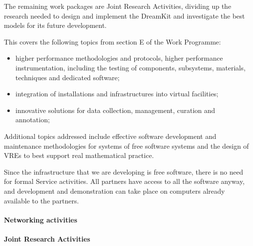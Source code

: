 
The remaining work packages are Joint Research Activities, dividing up
the research needed to design and implement the DreamKit and
investigate the best models for its future development. 

This covers the following topics from section E of the Work Programme:

\begin{itemize}
\item higher performance methodologies and protocols, higher performance instrumentation,
including the testing of components, subsystems, materials, techniques and dedicated
software;
\item integration of installations and infrastructures into virtual facilities;
\item innovative solutions for data collection, management, curation
  and annotation;
\end{itemize}


Additional topics addressed include effective software development and
maintenance methodologies for systems of free software systems and the
design of VREs to best support real mathematical practice.


Since the infrastructure that we are developing is free software,
there is no need for formal Service activities. All partners have
access to all the software anyway, and development and demonstration
can take place on computers already available to the partners. 

\paragraph{Networking activities}

\paragraph{Joint Research Activities}

